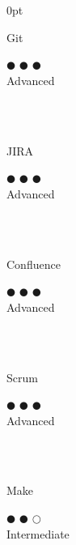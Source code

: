 \documentclass[a4paper]{article}
\begin{document}
\begin{adjustwidth}{\parindent}{0pt}
\begin{minipage}[t]{0.25\textwidth}
 \begin{minipage}{0.65\textwidth}
  \small{Git}
\end{minipage}
\begin{minipage}{0.3\textwidth}
  \centering $\mdlgblkcircle$ $\mdlgblkcircle$ $\mdlgblkcircle$ \\  \footnotesize{Advanced}
\end{minipage} \\ \hspace{0pt} \\

\begin{minipage}{0.65\textwidth}
  \small{JIRA}
\end{minipage}
\begin{minipage}{0.3\textwidth}
  \centering $\mdlgblkcircle$ $\mdlgblkcircle$ $\mdlgblkcircle$ \\  \footnotesize{Advanced}
\end{minipage} \\ \hspace{0pt} \\

\begin{minipage}{0.65\textwidth}
  \small{Confluence}
\end{minipage}
\begin{minipage}{0.3\textwidth}
  \centering $\mdlgblkcircle$ $\mdlgblkcircle$ $\mdlgblkcircle$ \\  \footnotesize{Advanced}
\end{minipage} \\ \hspace{0pt} \\

\begin{minipage}{0.65\textwidth}
  \small{Scrum}
\end{minipage}
\begin{minipage}{0.3\textwidth}
  \centering $\mdlgblkcircle$ $\mdlgblkcircle$ $\mdlgblkcircle$ \\  \footnotesize{Advanced}
\end{minipage} \\ \hspace{0pt} \\

\begin{minipage}{0.65\textwidth}
  \small{Make}
\end{minipage}
\begin{minipage}{0.3\textwidth}
  \centering $\mdlgblkcircle$ $\mdlgblkcircle$ $\mdlgwhtcircle$ \\  \footnotesize{Intermediate}
\end{minipage} \\ \hspace{0pt} \\


\end{minipage}
\end{adjustwidth}
\end{document}
